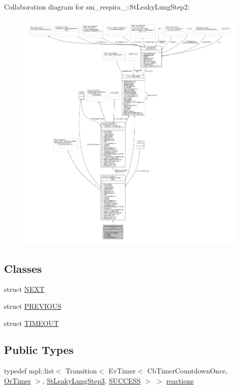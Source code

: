 Collaboration diagram for sm\+\_\+respira\+\_\+:\+:St\+Leaky\+Lung\+Step2\+:
\nopagebreak
\begin{figure}[H]
\begin{center}
\leavevmode
\includegraphics[width=350pt]{structsm__respira__1_1_1StLeakyLungStep2__coll__graph}
\end{center}
\end{figure}
\subsection*{Classes}
\begin{DoxyCompactItemize}
\item 
struct \hyperlink{structsm__respira__1_1_1StLeakyLungStep2_1_1NEXT}{N\+E\+XT}
\item 
struct \hyperlink{structsm__respira__1_1_1StLeakyLungStep2_1_1PREVIOUS}{P\+R\+E\+V\+I\+O\+US}
\item 
struct \hyperlink{structsm__respira__1_1_1StLeakyLungStep2_1_1TIMEOUT}{T\+I\+M\+E\+O\+UT}
\end{DoxyCompactItemize}
\subsection*{Public Types}
\begin{DoxyCompactItemize}
\item 
typedef mpl\+::list$<$ Transition$<$ Ev\+Timer$<$ Cb\+Timer\+Countdown\+Once, \hyperlink{classsm__respira__1_1_1OrTimer}{Or\+Timer} $>$, \hyperlink{structsm__respira__1_1_1StLeakyLungStep3}{St\+Leaky\+Lung\+Step3}, \hyperlink{classSUCCESS}{S\+U\+C\+C\+E\+SS} $>$ $>$ \hyperlink{structsm__respira__1_1_1StLeakyLungStep2_a6f3328bf0e1d12655e24a208d19ca9e2}{reactions}
\end{DoxyCompactItemize}
